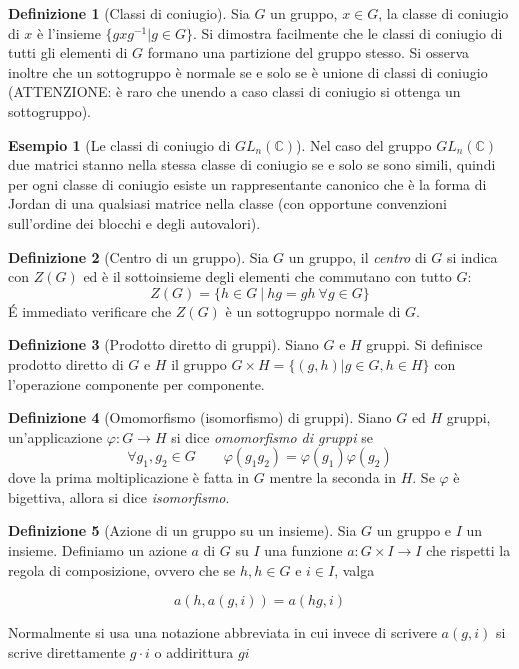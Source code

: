 \documentclass[11pt]{article}
\theoremstyle{plain}
\theoremstyle{definition}
\newtheorem{defn}{Definizione}[section]
\newtheorem{exmp}{Esempio}[section]
\theoremstyle{remark}
\newcommand{\C}{\mathbb{C}}
\begin{document}
\begin{defn}[Classi di coniugio]
Sia $G$ un gruppo, $x \in G$, la classe di coniugio di $x$ è l'insieme $\{ gxg^{-1} | g\in G \}$. Si dimostra facilmente che le classi di coniugio di tutti gli elementi di $G$ formano una partizione del gruppo stesso. Si osserva inoltre che un sottogruppo è normale se e solo se è unione di classi di coniugio (ATTENZIONE: è raro che unendo a caso classi di coniugio si ottenga un sottogruppo).
\end{defn}


\begin{exmp}[Le classi di coniugio di $GL_n(\C)$]
Nel caso del gruppo $GL_n(\C)$ due matrici stanno nella stessa classe di coniugio se e solo se sono simili, quindi per ogni classe di coniugio esiste un rappresentante canonico che è la forma di Jordan di una qualsiasi matrice nella classe (con opportune convenzioni sull'ordine dei blocchi e degli autovalori).
\end{exmp}

\begin{defn}[Centro di un gruppo]
	Sia $G$ un gruppo, il \textit{centro} di $G$ si indica con $Z(G)$ ed è il sottoinsieme degli elementi che commutano con tutto $G$:
	\[
		Z(G)=\{ h\in G\ |\ hg=gh\ \forall g\in G \}
	\]
	\'E immediato verificare che $Z(G)$ è un sottogruppo normale di $G$.

\end{defn}

\begin{defn}[Prodotto diretto di gruppi]
Siano $G$ e $H$ gruppi. Si definisce prodotto diretto di $G$ e $H$ il gruppo $G \times H = \{ (g, h) | g \in G, h \in H\}$ con l'operazione componente per componente.
\end{defn}


\begin{defn}[Omomorfismo (isomorfismo) di gruppi]
Siano $G$ ed $H$ gruppi, un'applicazione $\varphi:G\to H$ si dice \textit{omomorfismo di gruppi} se
\[
	\forall g_1,g_2\in G\qquad \varphi(g_1 g_2)=\varphi(g_1)\varphi(g_2)
\]
dove la prima moltiplicazione è fatta in $G$ mentre la seconda in $H$.
Se $\varphi$ è bigettiva, allora si dice \textit{isomorfismo}.
\end{defn}


\begin{defn}[Azione di un gruppo su un insieme] Sia $G$ un gruppo e $I$ un insieme. Definiamo un azione $a$ di $G$ su $I$ una funzione $a:G\times I \to I$ che rispetti la regola di composizione, ovvero che se $h,h\in G$ e $i \in I$, valga

\[ a(h,a(g,i)) = a(hg, i) \]

Normalmente si usa una notazione abbreviata in cui invece di scrivere $a(g,i)$ si scrive direttamente $g\cdot i$ o addirittura $gi$


\label{defn:azione}
\end{defn}
\end{document}
